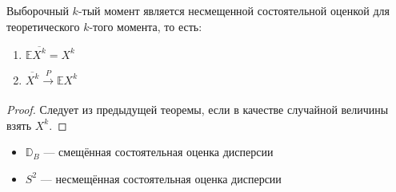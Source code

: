 \begin{theorem}
    Выборочный \(k\)-тый момент является несмещенной состоятельной оценкой для теоретического \(k\)-того момента, то есть:
    \begin{enumerate}
        \item \(\mathbb{E} \overline{X^k} = X^k\)
        \item \(\overline{X^k} \xrightarrow[]{P} \mathbb{E} X^k\)
    \end{enumerate}
\end{theorem}
\begin{proof}
    Следует из предыдущей теоремы, если в качестве случайной величины взять \(X^k\).
\end{proof}

\begin{theorem}\itemfix
    \begin{itemize}
        \item \(\mathbb{D}_B\) --- смещённая состоятельная оценка дисперсии
        \item \(S^2\) --- несмещённая состоятельная оценка дисперсии
    \end{itemize}
\end{theorem}
